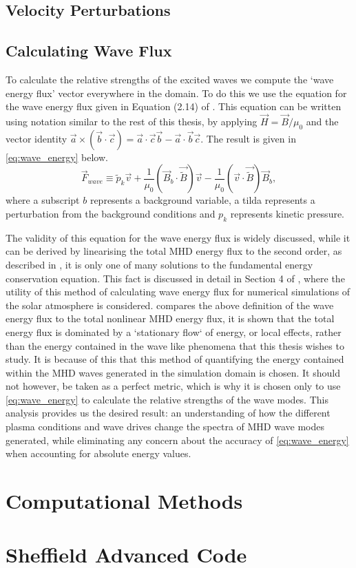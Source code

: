 \subsection{Velocity Perturbations}\label{sec:Vpert}

\subsection{Calculating Wave Flux}\label{sec:waveflux}

To calculate the relative strengths of the excited waves we compute the `wave energy flux' vector everywhere in the domain.
To do this we use the equation for the wave energy flux given in Equation (2.14) of \cite{leroy1985}.
This equation can be written using notation similar to the rest of this thesis, by applying $\vec{H} = \vec{B}/\mu_0$ and the vector identity $\vec{a} \times (\vec{b} \cdot \vec{c}) = \vec{a} \cdot \vec{c}\vec{b} - \vec{a} \cdot \vec{b}\vec{c}$.
The result is given in \cref{eq:wave_energy} below.
\begin{equation}
\vec{F}_{wave} \equiv \widetilde{p}_k \vec{v} + \frac{1}{\mu_0} \left(\vec{B}_b \cdot \vec{\widetilde{B}}\right) \vec{v} - \frac{1}{\mu_0}\left(\vec{v} \cdot \vec{\widetilde{B}} \right) \vec{B}_b,
\label{eq:wave_energy}
\end{equation}
where a subscript $b$ represents a background variable, a tilda represents a perturbation from the background conditions and $p_k$ represents kinetic pressure.

The validity of this equation for the wave energy flux is widely discussed, while it can be derived by linearising the total MHD energy flux to the second order, as described in \cite{leroy1985}, it is only one of many solutions to the fundamental energy conservation equation.
This fact is discussed in detail in Section 4 of \cite{bogdan2003}, where the utility of this method of calculating wave energy flux for numerical simulations of the solar atmosphere is considered.
\cite{bogdan2003} compares the above definition of the wave energy flux to the total nonlinear MHD energy flux, it is shown that the total energy flux is dominated by a `stationary flow` of energy, or local effects, rather than the energy contained in the wave like phenomena that this thesis wishes to study.
It is because of this that this method of quantifying the energy contained within the MHD waves generated in the simulation domain is chosen.
It should not however, be taken as a perfect metric, which is why it is chosen only to use \cref{eq:wave_energy} to calculate the relative strengths of the wave modes.
This analysis provides us the desired result: an understanding of how the different plasma conditions and wave drives change the spectra of MHD wave modes generated, while eliminating any concern about the accuracy of \cref{eq:wave_energy} when accounting for absolute energy values.

\section{Computational Methods}\label{sec:numericalmethods}

\section{Sheffield Advanced Code}\label{sec:SAC}
